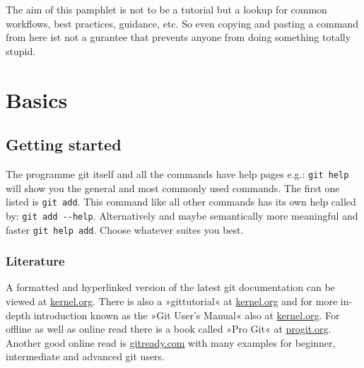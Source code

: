 The aim of this pamphlet is not to be a tutorial but a lookup for common workflows, best practices, guidance, etc. So even copying and pasting a command from here ist not a gurantee that prevents anyone from doing something totally stupid.
\section{Basics}
\subsection{Getting started}
The programme git itself and all the commands have help pages e.g.: \texttt{git help} will show you the general and most commonly used commands. The first one listed is \texttt{git add}. This command like all other commands has its own help called by: \texttt{git add -{}-help}. Alternatively and maybe semantically more meaningful and faster \texttt{git help add}. Choose whatever suites you best.
\subsubsection{Literature}
A formatted and hyperlinked version of the latest git documentation can be viewed at \href{http://www.kernel.org/pub/software/scm/git/docs/}{kernel.org}. There is also a »gittutorial« at \href{http://www.kernel.org/pub/software/scm/git/docs/gittutorial.html}{kernel.org} and for more in-depth introduction known as the »Git User’s Manual« also at \href{http://www.kernel.org/pub/software/scm/git/docs/user-manual.html}{kernel.org}. For offline as well as online read there is a book called »Pro Git« at \href{http://progit.org/}{progit.org}. Another good online read is \href{http://gitready.com/}{gitready.com} with many examples for beginner, intermediate and advanced git users.
